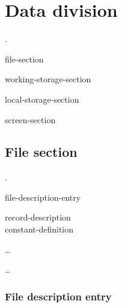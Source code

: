 \chapter{Data division}

\begin{0-1}
   .
\end{0-1}\newline
\begin{0-1}
  file-section
\end{0-1}\newline
\begin{0-1}
  working-storage-section
\end{0-1}\newline
\begin{0-1}
  local-storage-section
\end{0-1}\newline
\begin{0-1}
\end{0-1}\newline
\begin{0-1}
  screen-section
\end{0-1}\newline

\section{File section}

\begin{0-1}
   .
\end{0-1}\newline
\begin{1=}
  file-description-entry
  \begin{1=}
    record-description \\
    constant-definition
  \end{1=}\ldots
\end{1=}\ldots

\subsection{File description entry}

